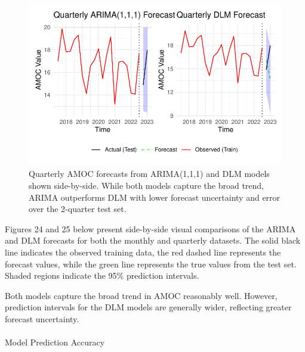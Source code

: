 \documentclass[
  11pt,
]{article}
\makeatletter
\let\oldparagraph\paragraph
\renewcommand{\paragraph}{
    \@ifstar
      \xxxParagraphStar
      \xxxParagraphNoStar
  }
\newcommand{\xxxParagraphStar}[1]{\oldparagraph*{#1}\mbox{}}
\newcommand{\xxxParagraphNoStar}[1]{\oldparagraph{#1}\mbox{}}
\makeatother
\begin{document}
\begin{figure}[H]

{\centering \includegraphics{project_files/figure-pdf/fig-quarterlyforecast-1.pdf}

}

\caption{Quarterly AMOC forecasts from ARIMA(1,1,1) and DLM models shown
side-by-side. While both models capture the broad trend, ARIMA
outperforms DLM with lower forecast uncertainty and error over the
2-quarter test set.}

\end{figure}%

Figures 24 and 25 below present side-by-side visual comparisons of the
ARIMA and DLM forecasts for both the monthly and quarterly datasets. The
solid black line indicates the observed training data, the red dashed
line represents the forecast values, while the green line represents the
true values from the test set. Shaded regions indicate the 95\%
prediction intervals.

Both models capture the broad trend in AMOC reasonably well. However,
prediction intervals for the DLM models are generally wider, reflecting
greater forecast uncertainty.

\paragraph{Model Prediction Accuracy}\label{model-prediction-accuracy}
\end{document}
